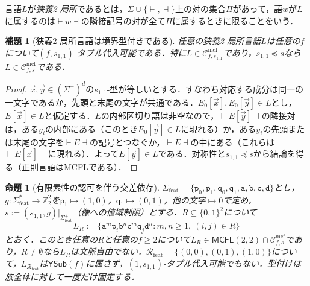 \documentclass[11pt,a4paper]{ltjsarticle}
\numberwithin{equation}{section}
\theoremstyle{plain}
\newtheorem{lemma}[theorem]{補題}
\newtheorem{proposition}[theorem]{命題}
\theoremstyle{definition}
\theoremstyle{remark}
\newcommand{\Cmcf}[2]{\mathcal{C}^{\mathrm{mcf}}_{#1,#2}}
\newcommand{\tuple}[1]{\vec{#1}}
\newcommand{\YSub}[1]{\mathsf{YSub}(#1)}
\begin{document}
言語$L$が\emph{狭義2-局所}であるとは，$\Sigma\cup\{\vdash,\dashv\}$上の対の集合$\Pi$があって，語$w$が$L$に属するのは$\vdash w\dashv$の隣接記号の対が全て$\Pi$に属するときに限ることをいう．

\begin{lemma}[狭義2-局所言語は境界型付きである]
\label{lem:sl2-boundary-control}
任意の狭義2-局所言語$L$は任意の$f$について$(f,s_{1,1})$-タプル代入可能である．特に$L\in\Cmcf{f}{s_{1,1}}$であり，$s_{1,1}\preceq s$なら$L\in\Cmcf{f}{s}$である．
\end{lemma}

\begin{proof}
$\tuple x,\tuple y\in(\Sigma^+)^d$の$s_{1,1}$-型が等しいとする．すなわち対応する成分は同一の一文字であるか，先頭と末尾の文字が共通である．$E_0[\tuple x],E_0[\tuple y]\in L$とし，$E[\tuple x]\in L$と仮定する．$E$の内部区切り語は非空なので，$\vdash E[\tuple y]\dashv$の隣接対は，ある$y_i$の内部にある（このとき$E_0[\tuple y]\in L$に現れる）か，ある$y_i$の先頭または末尾の文字を$\vdash E\dashv$の記号とつなぐか，$\vdash E\dashv$の中にある（これらは$\vdash E[\tuple x]\dashv$に現れる）．よって$E[\tuple y]\in L$である．対称性と$s_{1,1}\preceq s$から結論を得る（正則言語はMCFLである）．
\end{proof}

\begin{proposition}[有限素性の認可を伴う交差依存]
\label{prop:feature-cross-typed}
$\Sigma_{\mathrm{feat}}=\{\mathtt p_0,\mathtt p_1,\mathtt q_0,\mathtt q_1,\mathtt a,\mathtt b,\mathtt c,\mathtt d\}$とし，$g:\Sigma_{\mathrm{feat}}^*\to\mathbb Z_2^2$を$\mathtt p_1\mapsto(1,0)$，$\mathtt q_1\mapsto(0,1)$，他の文字$\mapsto0$で定め，$s:=(s_{1,1},g)|_{\Sigma_{\mathrm{feat}}^+}$（像への値域制限）とする．$R\subseteq\{0,1\}^2$について
\[
 L_R:=\{\mathtt a^m\mathtt p_i\mathtt b^n\mathtt c^m\mathtt q_j\mathtt d^n:
 m,n\ge1,\ (i,j)\in R\}
\]
とおく．このとき任意の$R$と任意の$f\ge2$について$L_R\in\mathsf{MCFL}(2,2)\cap\Cmcf{f}{s}$であり，$R\ne\emptyset$なら$L_R$は文脈自由でない．$\mathcal R_{\mathrm{feat}}=\{(0,0),(0,1),(1,0)\}$について，$L_{\mathcal R_{\mathrm{feat}}}$は$\YSub{f}$に属さず，$(1,s_{1,1})$-タプル代入可能でもない．型付けは族全体に対して一度だけ固定する．
\end{proposition}
\end{document}
